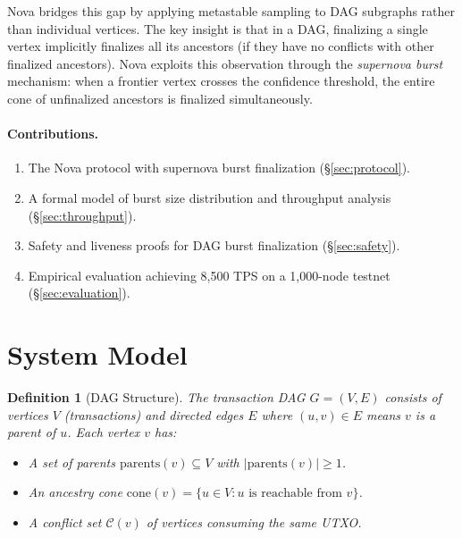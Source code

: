 \documentclass[11pt,a4paper]{article}
\newtheorem{definition}{Definition}[section]
\begin{document}
Nova bridges this gap by applying metastable sampling to DAG subgraphs rather than
individual vertices. The key insight is that in a DAG, finalizing a single vertex
implicitly finalizes all its ancestors (if they have no conflicts with other finalized
ancestors). Nova exploits this observation through the \emph{supernova burst} mechanism:
when a frontier vertex crosses the confidence threshold, the entire cone of unfinalized
ancestors is finalized simultaneously.

\paragraph{Contributions.}
\begin{enumerate}[nosep]
\item The Nova protocol with supernova burst finalization (\S\ref{sec:protocol}).
\item A formal model of burst size distribution and throughput analysis (\S\ref{sec:throughput}).
\item Safety and liveness proofs for DAG burst finalization (\S\ref{sec:safety}).
\item Empirical evaluation achieving 8,500 TPS on a 1,000-node testnet (\S\ref{sec:evaluation}).
\end{enumerate}

\section{System Model}
\label{sec:model}

\begin{definition}[DAG Structure]
The transaction DAG $G = (V, E)$ consists of vertices $V$ (transactions) and directed
edges $E$ where $(u, v) \in E$ means $v$ is a parent of $u$. Each vertex $v$ has:
\begin{itemize}[nosep]
\item A set of parents $\text{parents}(v) \subseteq V$ with $|\text{parents}(v)| \geq 1$.
\item An ancestry cone $\text{cone}(v) = \{u \in V : u \text{ is reachable from } v\}$.
\item A conflict set $\mathcal{C}(v)$ of vertices consuming the same UTXO.
\end{itemize}
\end{definition}
\end{document}
